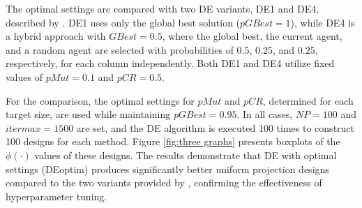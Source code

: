 \documentclass [PhD] {package/uclathes}
\begin{document}
The optimal settings are compared with two DE variants, DE1 and DE4, described by \textcite{stokes2023metaheuristic}. DE1 uses only the global best solution (\( pGBest = 1 \)), while DE4 is a hybrid approach with \( GBest = 0.5 \), where the global best, the current agent, and a random agent are selected with probabilities of \( 0.5 \), \( 0.25 \), and \( 0.25 \), respectively, for each column independently. Both DE1 and DE4 utilize fixed values of \( pMut = 0.1 \) and \( pCR = 0.5 \).  

For the comparison, the optimal settings for \( pMut\) and \( pCR \), determined for each target size, are used while maintaining \( pGBest = 0.95 \). In all cases, \( NP = 100 \) and \( itermax = 1500 \) are set, and the DE algorithm is executed 100 times to construct 100 designs for each method. Figure \ref{fig:three graphs} presents boxplots of the \( \phi(\cdot) \) values of these designs. The results demonstrate that DE with optimal settings (DEoptim) produces significantly better uniform projection designs compared to the two variants provided by \textcite{stokes2023metaheuristic}, confirming the effectiveness of hyperparameter tuning.
\end{document}
